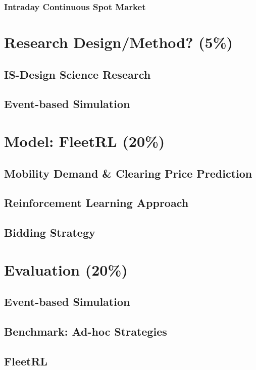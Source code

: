 \documentclass[12pt, article]{article}
\begin{document}
\subsubsection{Intraday Continuous Spot Market}
\label{sec:org8ae48ff}

\section{Research Design/Method? (5\%)}
\label{sec:org6ffe9a2}
\subsection{IS-Design Science Research}
\label{sec:org6a6e64e}
\subsection{Event-based Simulation}
\label{sec:orgcceecc5}

\section{Model: FleetRL (20\%)}
\label{sec:org3333b49}
\subsection{Mobility Demand \& Clearing Price Prediction}
\label{sec:orgb441588}
\subsection{Reinforcement Learning Approach}
\label{sec:org9eff4ae}
\subsection{Bidding Strategy}
\label{sec:orgc6778e6}

\section{Evaluation (20\%)}
\label{sec:org3381d2e}
\subsection{Event-based Simulation}
\label{sec:orgc180ef0}
\subsection{Benchmark: Ad-hoc Strategies}
\label{sec:org7456ed5}
\subsection{FleetRL}
\label{sec:orgb57d845}
\end{document}
